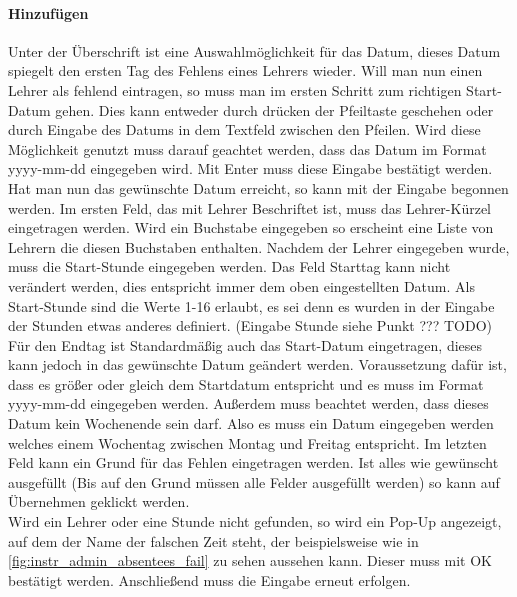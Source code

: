 \paragraph{Hinzufügen}
Unter der Überschrift ist eine Auswahlmöglichkeit für das Datum, dieses Datum spiegelt den ersten Tag des Fehlens eines Lehrers wieder. Will man nun einen Lehrer als fehlend eintragen, so muss man im ersten Schritt zum richtigen Start-Datum gehen. Dies kann entweder durch drücken der Pfeiltaste geschehen oder durch Eingabe des Datums in dem Textfeld zwischen den Pfeilen. Wird diese Möglichkeit genutzt muss darauf geachtet werden, dass das Datum im Format yyyy-mm-dd eingegeben wird. Mit Enter muss diese Eingabe bestätigt werden.\\
Hat man nun das gewünschte Datum erreicht, so kann mit der Eingabe begonnen werden. Im ersten Feld, das mit Lehrer Beschriftet ist, muss das Lehrer-Kürzel eingetragen werden. Wird ein Buchstabe eingegeben so erscheint eine Liste von Lehrern die diesen Buchstaben enthalten. Nachdem der Lehrer eingegeben wurde, muss die Start-Stunde eingegeben werden. Das Feld Starttag kann nicht verändert werden, dies entspricht immer dem oben eingestellten Datum. Als Start-Stunde sind die Werte 1-16 erlaubt, es sei denn es wurden in der Eingabe der Stunden etwas anderes definiert. (Eingabe Stunde siehe Punkt ??? TODO) Für den Endtag ist Standardmäßig auch das Start-Datum eingetragen, dieses kann jedoch in das gewünschte Datum geändert werden. Voraussetzung dafür ist, dass es größer oder gleich dem Startdatum entspricht und es muss im Format yyyy-mm-dd eingegeben werden. Außerdem muss beachtet werden, dass dieses Datum kein Wochenende sein darf. Also es muss ein Datum eingegeben werden welches einem Wochentag zwischen Montag und Freitag entspricht. Im letzten Feld kann  ein Grund für das Fehlen eingetragen werden. Ist alles wie gewünscht ausgefüllt (Bis auf den Grund müssen alle Felder ausgefüllt werden) so kann auf Übernehmen geklickt werden.\\
Wird ein Lehrer oder eine Stunde nicht gefunden, so wird ein Pop-Up angezeigt, auf dem der Name der falschen Zeit steht, der beispielsweise wie in \autoref{fig:instr_admin_absentees_fail} zu sehen aussehen kann. Dieser muss mit OK bestätigt werden. Anschließend muss die Eingabe erneut erfolgen.\
